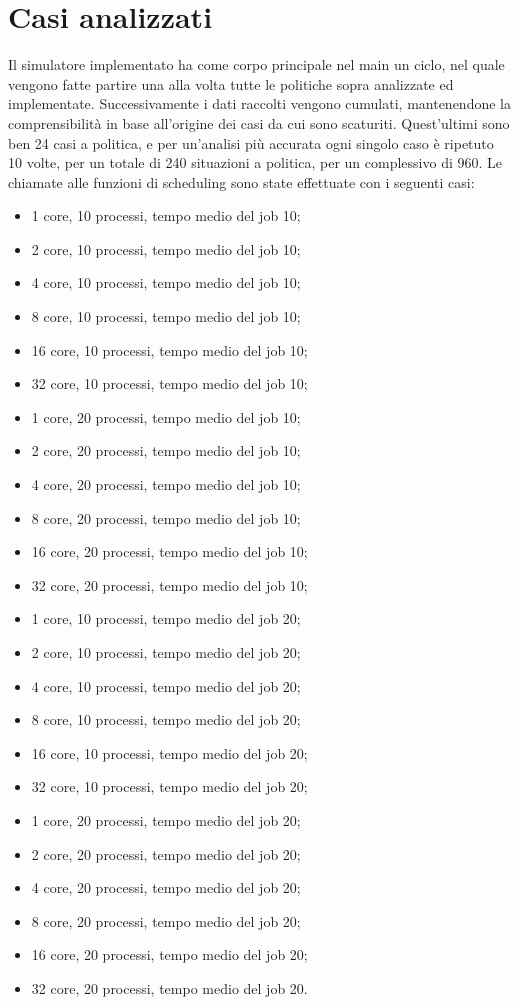 \documentclass[Lau, oneside]{sapthesis}%
\begin{document}
\section{Casi analizzati}
\label{sec:casi}
Il simulatore implementato ha come corpo principale nel main un ciclo, nel quale vengono fatte partire una alla volta tutte le politiche sopra analizzate ed implementate.
Successivamente i dati raccolti vengono cumulati, mantenendone la comprensibilità in base all'origine dei casi da cui sono scaturiti.
Quest'ultimi sono ben 24 casi a politica, e per un'analisi più accurata ogni singolo caso è ripetuto 10 volte, per un totale di 240 situazioni a politica, per un complessivo di 960.
Le chiamate alle funzioni di scheduling sono state effettuate con i seguenti casi:
\begin{itemize}
    \item 1 core, 10 processi, tempo medio del job 10;
    \item 2 core, 10 processi, tempo medio del job 10;
    \item 4 core, 10 processi, tempo medio del job 10;
    \item 8 core, 10 processi, tempo medio del job 10;
    \item 16 core, 10 processi, tempo medio del job 10;
    \item 32 core, 10 processi, tempo medio del job 10; 
    \item 1 core, 20 processi, tempo medio del job 10;
    \item 2 core, 20 processi, tempo medio del job 10;
    \item 4 core, 20 processi, tempo medio del job 10;
    \item 8 core, 20 processi, tempo medio del job 10;
    \item 16 core, 20 processi, tempo medio del job 10;
    \item 32 core, 20 processi, tempo medio del job 10;
    \item 1 core, 10 processi, tempo medio del job 20;
    \item 2 core, 10 processi, tempo medio del job 20;
    \item 4 core, 10 processi, tempo medio del job 20;
    \item 8 core, 10 processi, tempo medio del job 20;
    \item 16 core, 10 processi, tempo medio del job 20;
    \item 32 core, 10 processi, tempo medio del job 20; 
    \item 1 core, 20 processi, tempo medio del job 20;
    \item 2 core, 20 processi, tempo medio del job 20;
    \item 4 core, 20 processi, tempo medio del job 20;
    \item 8 core, 20 processi, tempo medio del job 20;
    \item 16 core, 20 processi, tempo medio del job 20;
    \item 32 core, 20 processi, tempo medio del job 20.
\end{itemize}
\end{document}
